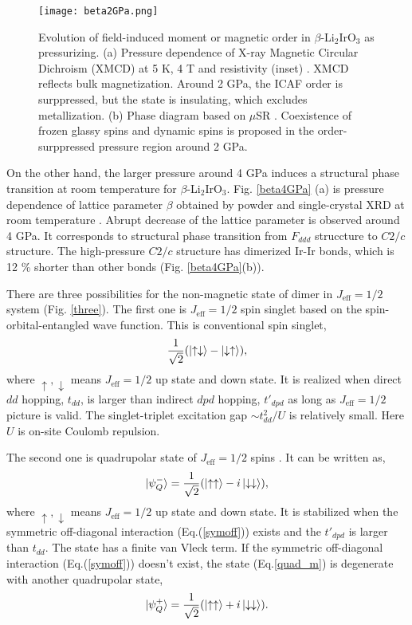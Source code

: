 \begin{figure}
  \centering
  \texttt{[image: beta2GPa.png]}
  \caption{Evolution of field-induced moment or magnetic order in $\beta$-Li$_2$IrO$_3$ as pressurizing.
  (a) Pressure dependence of X-ray Magnetic Circular Dichroism (XMCD) at 5 K, 4 T and resistivity (inset) \cite{takayama2015hyperhoneycomb}.
  XMCD reflects bulk magnetization.
  Around 2 GPa, the ICAF order is surppressed, but the state is insulating, which excludes metallization.
  (b) Phase diagram based on $\mu$SR \cite{Majumder2018}.
  Coexistence of frozen glassy spins and dynamic spins is proposed in the order-surppressed pressure region around 2 GPa.}
  \label{beta2GPa}
\end{figure}

On the other hand, the larger pressure around 4 GPa induces a structural phase transition at room temperature for $\beta$-Li$_2$IrO$_3$.
Fig. \ref{beta4GPa} (a) is pressure dependence of lattice parameter $\beta$ obtained by powder and single-crystal XRD at room temperature \cite{veiga2017pressure}.
Abrupt decrease of the lattice parameter is observed around 4 GPa.
It corresponds to structural phase transition from $F_{ddd}$ struccture to $C2/c$ structure.
The high-pressure $C2/c$ structure has dimerized Ir-Ir bonds, which is 12 \% shorter than other bonds (Fig. \ref{beta4GPa}(b)).

There are three possibilities for the non-magnetic state of dimer in $J_{\mathrm{eff}} = 1/2$ system (Fig. \ref{three}).
The first one is $J_{\mathrm{eff}} = 1/2$ spin singlet based on the spin-orbital-entangled wave function.
This is conventional spin singlet,
\begin{equation}
\frac{1}{\sqrt{2}}(\ket{\uparrow\downarrow}-\ket{\downarrow\uparrow}),
\end{equation}
where $\uparrow, \downarrow$ means $J_{\mathrm{eff}} = 1/2$ up state and down state.
It is realized when direct $dd$ hopping, $t_{dd}$, is larger than indirect $dpd$ hopping, $t'_{dpd}$
as long as $J_{\mathrm{eff}} = 1/2$ picture is valid.
The singlet-triplet excitation gap $\sim t^2_{dd}/U$ is relatively small.
Here $U$ is on-site Coulomb repulsion.

The second one is quadrupolar state of $J_{\mathrm{eff}} = 1/2$ spins \cite{Nasu2014}.
It can be written as,
\begin{equation}
\ket{\psi^-_Q} = \frac{1}{\sqrt{2}}(\ket{\uparrow\uparrow}-i\ket{\downarrow\downarrow}),
\label{quad_m}
\end{equation}
where $\uparrow, \downarrow$ means $J_{\mathrm{eff}} = 1/2$ up state and down state.
It is stabilized when the symmetric off-diagonal interaction (Eq.(\ref{symoff})) exists and the $t'_{dpd}$ is larger than $t_{dd}$.
The state has a finite van Vleck term.
If the symmetric off-diagonal interaction (Eq.(\ref{symoff})) doesn't exist, the state (Eq.\ref{quad_m}) is degenerate with another quadrupolar state,
\begin{equation}
\ket{\psi^+_Q} = \frac{1}{\sqrt{2}}(\ket{\uparrow\uparrow}+i\ket{\downarrow\downarrow}).
\label{quad_p}
\end{equation}

